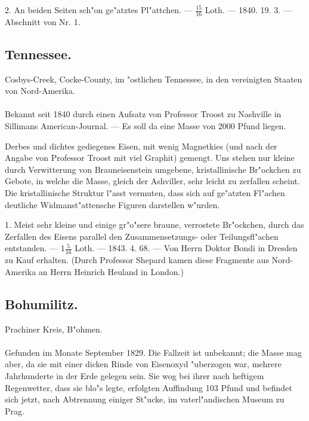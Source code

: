 \documentclass[a4paper, 11pt, oneside, polutonikogreek, german]{article}
\begin{document}
2. An beiden Seiten sch"on ge"atztes Pl"attchen. --- $\frac{15}{16}$ Loth. --- 1840. 19. 3. --- Abschnitt von Nr. 1.
\subsection{Tennessee.}
\begin{center}
\small
Cosbys-Creek, Cocke-County, im "ostlichen Tennessee, in den vereinigten Staaten von Nord-Amerika.
\end{center}
\paragraph{}
Bekannt seit 1840 durch einen Aufsatz von Professor Troost zu Nashville in Sillimans American-Journal. --- Es soll da eine Masse von 2000 Pfund liegen.

Derbes und dichtes gediegenes Eisen, mit wenig Magnetkies (und nach der Angabe von Professor Troost mit viel Graphit) gemengt. Uns stehen nur kleine durch Verwitterung von Brauneisenstein umgebene, kristallinische Br"ockchen zu Gebote, in welche die Masse, gleich der Ashviller, sehr leicht zu zerfallen scheint. Die kristallinische Struktur l"asst vermuten, dass sich auf ge"atzten Fl"achen deutliche Widmanst"attensche Figuren darstellen w"urden.

1. Meist sehr kleine und einige gr"o"sere braune, verrostete Br"ockchen, durch das Zerfallen des Eisens parallel den Zusammensetzungs- oder Teilungsfl"achen entstanden. --- $1\frac{5}{16}$ Loth. --- 1843. 4. 68. --- Von Herrn Doktor Bondi in Dresden zu Kauf erhalten. (Durch Professor Shepard kamen diese Fragmente aus Nord-Amerika an Herrn Heinrich Heuland in London.)
\subsection{Bohumilitz.}
\begin{center}
\small
Prachiner Kreis, B"ohmen.
\end{center}
\paragraph{}
Gefunden im Monate September 1829. Die Fallzeit ist unbekannt; die Masse mag aber, da sie mit einer dicken Rinde von Eisenoxyd "uberzogen war, mehrere Jahrhunderte in der Erde gelegen sein. Sie wog bei ihrer nach heftigem Regenwetter, dass sie blo"s legte, erfolgten Auffindung 103 Pfund und befindet sich jetzt, nach Abtrennung einiger St"ucke, im vaterl"andischen Museum zu Prag.
\end{document}
